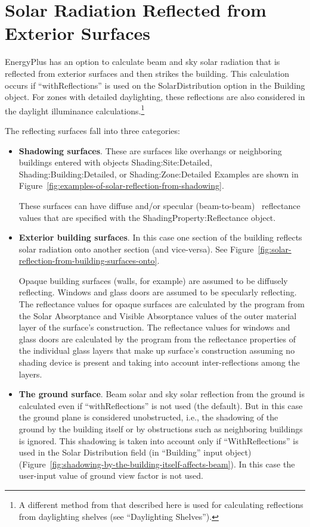 \chapter{Solar Radiation Reflected from Exterior Surfaces}\label{solar-radiation-reflected-from-exterior-surfaces}

EnergyPlus has an option to calculate beam and sky solar radiation that is reflected from exterior surfaces and then strikes the building. This calculation occurs if ``withReflections'' is used on the SolarDistribution option in the Building object. For zones with detailed daylighting, these reflections are also considered in the daylight illuminance calculations.\footnote{A different method from that described here is used for calculating reflections from daylighting shelves (see ``Daylighting Shelves'').}

The reflecting surfaces fall into three categories:

\begin{itemize}
\item
  \textbf{Shadowing surfaces}. These are surfaces like overhangs or neighboring buildings entered with objects Shading:Site:Detailed, Shading:Building:Detailed, or Shading:Zone:Detailed Examples are shown in Figure~\ref{fig:examples-of-solar-reflection-from-shadowing}.

These surfaces can have diffuse and/or specular (beam-to-beam)~ reflectance values that are specified with the ShadingProperty:Reflectance object.

\item
  \textbf{Exterior building surfaces}. In this case one section of the building reflects solar radiation onto another section (and vice-versa). See Figure~\ref{fig:solar-reflection-from-building-surfaces-onto}.

Opaque building surfaces (walls, for example) are assumed to be diffusely reflecting. Windows and glass doors are assumed to be specularly reflecting. The reflectance values for opaque surfaces are calculated by the program from the Solar Absorptance and Visible Absorptance values of the outer material layer of the surface's construction. The reflectance values for windows and glass doors are calculated by the program from the reflectance properties of the individual glass layers that make up surface's construction assuming no shading device is present and taking into account inter-reflections among the layers.

\item
  \textbf{The ground surface}. Beam solar and sky solar reflection from the ground is calculated even if ``withReflections'' is not used (the default). But in this case the ground plane is considered unobstructed, i.e., the shadowing of the ground by the building itself or by obstructions such as neighboring buildings is ignored. This shadowing is taken into account only if ``WithReflections'' is used in the Solar Distribution field (in ``Building'' input object) (Figure~\ref{fig:shadowing-by-the-building-itself-affects-beam}). In this case the user-input value of ground view factor is not used.
\end{itemize}

